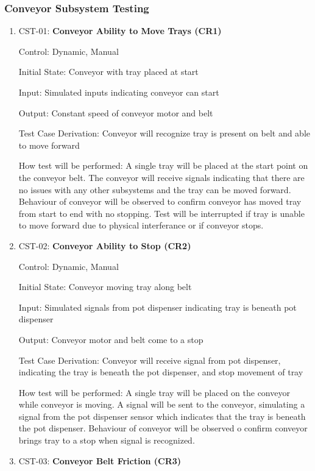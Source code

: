 \documentclass[12pt, titlepage]{article}
\begin{document}
\subsubsection{Conveyor Subsystem Testing}

\begin{enumerate}
\item{CST-01: \textbf{Conveyor Ability to Move Trays (CR1)}}

Control: Dynamic, Manual

Initial State: Conveyor with tray placed at start

Input: Simulated inputs indicating conveyor can start

Output: Constant speed of conveyor motor and belt

Test Case Derivation: Conveyor will recognize tray is present on belt and able to move forward

How test will be performed: A single tray will be placed at the start point on the conveyor belt. The conveyor 
will receive signals indicating that there are no issues with any other subsystems and the tray can be moved 
forward. Behaviour of conveyor will be observed to confirm conveyor has moved tray from start to end with no 
stopping. Test will be interrupted if tray is unable to move forward due to physical interferance or if conveyor stops.
\\
\item{CST-02: \textbf{Conveyor Ability to Stop (CR2)}}

Control: Dynamic, Manual

Initial State: Conveyor moving tray along belt

Input: Simulated signals from pot dispenser indicating tray is beneath pot dispenser

Output: Conveyor motor and belt come to a stop

Test Case Derivation: Conveyor will receive signal from pot dispenser, indicating the tray is beneath the pot
dispenser, and stop movement of tray

How test will be performed: A single tray will be placed on the conveyor while conveyor is moving. A signal will be 
sent to the conveyor, simulating a signal from the pot dispenser sensor which indicates that the tray is beneath 
the pot dispenser. Behaviour of conveyor will be observed o confirm conveyor brings tray to a stop when signal is 
recognized.
\\
\item{CST-03: \textbf{Conveyor Belt Friction (CR3)}}


\end{enumerate}
\end{document}

